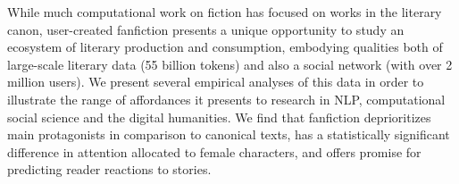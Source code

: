 While much computational work on fiction has focused on works in the literary canon, user-created fanfiction presents a unique opportunity to study an ecosystem of literary production and consumption, embodying qualities both of large-scale literary data (55 billion tokens) and also a social network (with over 2 million users).                    We present several empirical analyses of this data in order to illustrate the range of affordances it presents to research in NLP, computational social science and the digital humanities.  We find that fanfiction deprioritizes main protagonists in comparison to canonical texts, has a statistically significant difference in attention allocated to female characters, and offers promise for predicting reader reactions to stories.
